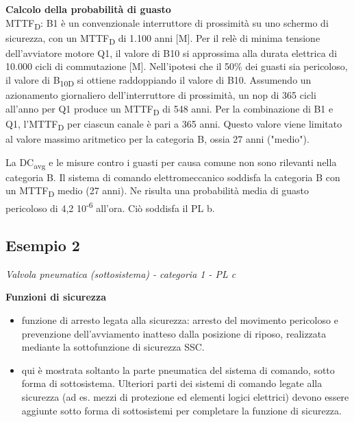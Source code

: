 \textbf{Calcolo della probabilità di guasto}\\
MTTF\textsubscript{D}: B1 è un convenzionale interruttore di prossimità su uno schermo di sicurezza, con un MTTF\textsubscript{D} di 1.100 anni [M]. Per il relè di minima tensione dell'avviatore motore Q1, il valore di B10 si approssima alla durata elettrica di 10.000 cicli di commutazione [M]. Nell'ipotesi che il 50\% dei guasti sia pericoloso, il valore di B\textsubscript{10D} si ottiene raddoppiando il valore di B10. Assumendo un azionamento giornaliero dell'interruttore di prossimità, un nop di 365 cicli all'anno per Q1 produce un MTTF\textsubscript{D} di 548 anni. Per la combinazione di B1 e Q1, l'MTTF\textsubscript{D} per ciascun canale è pari a 365 anni. Questo valore viene limitato al valore massimo aritmetico per la categoria B, ossia 27 anni ("medio").

La DC\textsubscript{avg} e le misure contro i guasti per causa comune non sono rilevanti nella categoria B.
Il sistema di comando elettromeccanico soddisfa la categoria B con un MTTF\textsubscript{D} medio (27 anni). Ne risulta una probabilità media di guasto pericoloso di 4,2 10\textsuperscript{-6} all'ora. Ciò soddisfa il PL b.
\clearpage
\subsection{Esempio 2}
\label{sec:08-2-2}
\textit{Valvola pneumatica (sottosistema) - categoria 1 - PL c}

\begin{center}
    \begin{minipage}{\textwidth}
        \centering
        \captionsetup{hypcap=false}
        \resizebox{0.8\textwidth}{!}{}
        \label{fig:08-05}
    \end{minipage}
\end{center}

\textbf{Funzioni di sicurezza}
\begin{itemize}
    \item funzione di arresto legata alla sicurezza: arresto del movimento pericoloso e prevenzione dell'avviamento inatteso dalla posizione di riposo, realizzata mediante la sottofunzione di sicurezza SSC.
    \item qui è mostrata soltanto la parte pneumatica del sistema di comando, sotto forma di sottosistema. Ulteriori parti dei sistemi di comando legate alla sicurezza (ad es. mezzi di protezione ed elementi logici elettrici) devono essere aggiunte sotto forma di sottosistemi per completare la funzione di sicurezza.
\end{itemize}


